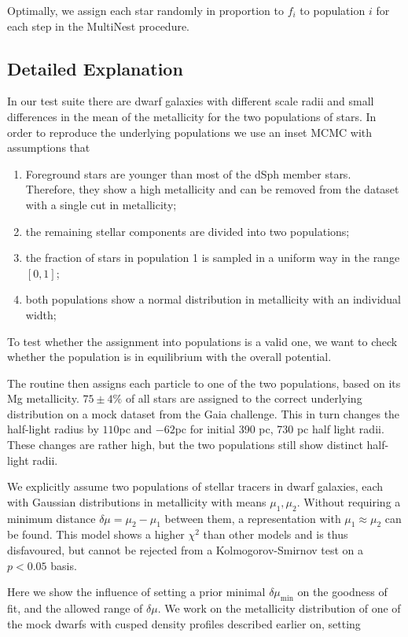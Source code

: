 Optimally, we assign each star randomly in proportion to $f_i$ to
population $i$ for each step in the MultiNest procedure.


\subsection{Detailed Explanation}
In our test suite there are dwarf galaxies with different scale radii
and small differences in the mean of the metallicity for the two
populations of stars. In order to reproduce the underlying populations
we use an inset MCMC with assumptions that

\begin{enumerate}
\item Foreground stars are younger than most of the dSph member
  stars. Therefore, they show a high metallicity and can be removed
  from the dataset with a single cut in metallicity;
\item the remaining stellar components are divided into two
  populations;
\item the fraction of stars in population 1 is sampled in a uniform
  way in the range $[0,1]$;
\item both populations show a normal distribution in metallicity with
  an individual width;
\end{enumerate}

To test whether the assignment into populations is a valid one, we
want to check whether the population is in equilibrium with the
overall potential.

The routine then assigns each particle to one of the two populations,
based on its Mg metallicity. $75\pm4\%$ of all stars are assigned to
the correct underlying distribution on a mock dataset from the Gaia challenge. This
in turn changes the half-light radius by $110$pc and $-62$pc for
initial 390 pc, 730 pc half light radii. These changes are rather
high, but the two populations still show distinct half-light radii.

We explicitly assume two populations of stellar tracers in dwarf
galaxies, each with Gaussian distributions in metallicity with means
$\mu_1,\mu_2$. Without requiring a minimum distance $\delta
\mu=\mu_2-\mu_1$ between them, a representation with $\mu_1 \approx
\mu_2$ can be found. This model shows a higher $\chi^2$ than other
models and is thus disfavoured, but cannot be rejected from a
Kolmogorov-Smirnov test on a $p<0.05$ basis.

Here we show the influence of setting a prior minimal
$\delta\mu_{\min}$ on the goodness of fit, and the allowed range of
$\delta \mu$. We work on the metallicity distribution of one of the
mock dwarfs with cusped density profiles described earlier on, setting

